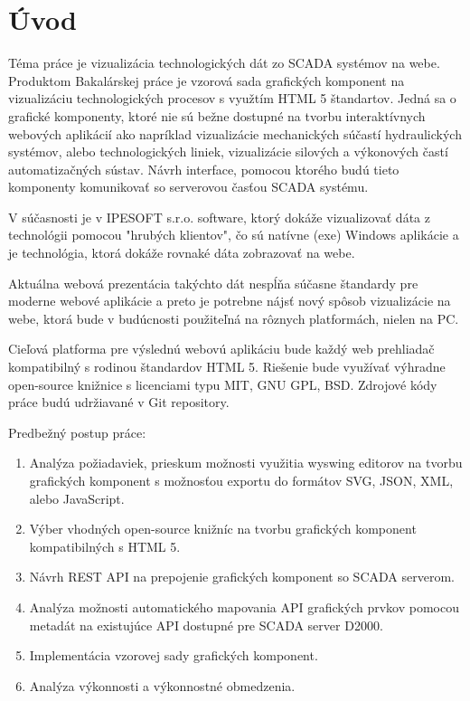 \chapter*{Úvod}

Téma práce je vizualizácia technologických dát zo SCADA systémov na webe.  Produktom Bakalárskej práce je  vzorová sada grafických komponent na vizualizáciu technologických procesov s využtím HTML 5 štandartov.  Jedná sa o grafické komponenty, ktoré nie sú bežne dostupné na tvorbu interaktívnych webových aplikácií ako napríklad vizualizácie mechanických súčastí hydraulických systémov, alebo technologických liniek, vizualizácie silových a výkonových častí automatizačných sústav. 
Návrh  interface, pomocou ktorého budú tieto komponenty komunikovať so serverovou časťou SCADA systému. 

V súčasnosti je v IPESOFT s.r.o. software, ktorý dokáže vizualizovať dáta z technológii pomocou "hrubých klientov",  čo sú natívne (exe) Windows aplikácie a je technológia,  ktorá dokáže rovnaké dáta zobrazovať na webe. 

Aktuálna webová prezentácia takýchto dát nespĺňa súčasne štandardy pre moderne webové aplikácie a preto je potrebne nájsť nový spôsob vizualizácie na webe, ktorá bude v budúcnosti použiteľná na rôznych platformách, nielen na PC. 


Cieľová platforma pre výslednú webovú aplikáciu bude každý web prehliadač kompatibilný s rodinou štandardov HTML 5. Riešenie bude využívať výhradne open-source knižnice s licenciami typu MIT, GNU GPL, BSD. Zdrojové kódy práce budú udržiavané v Git repository.

Predbežný postup práce:

\begin{enumerate}
\item  Analýza požiadaviek, prieskum možnosti využitia wyswing editorov na tvorbu grafických komponent s možnosťou exportu do formátov SVG, JSON, XML, alebo JavaScript.
\item Výber vhodných open-source knižníc na tvorbu grafických komponent kompatibilných s HTML 5.
\item Návrh REST API na prepojenie grafických komponent so SCADA serverom.
\item  Analýza možnosti automatického mapovania API grafických prvkov pomocou metadát na existujúce API dostupné pre SCADA server D2000.
\item  Implementácia vzorovej sady grafických komponent.
\item  Analýza výkonnosti a výkonnostné obmedzenia.
\end{enumerate}